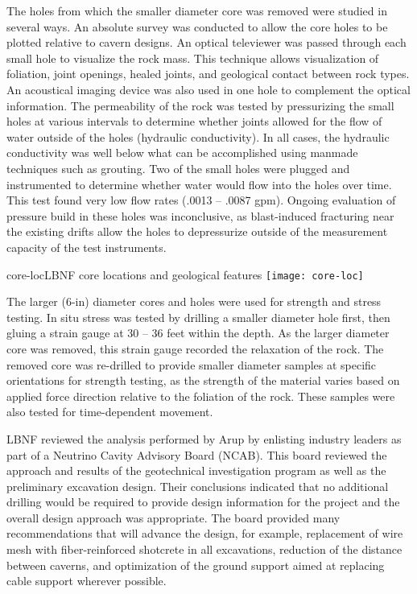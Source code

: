 The holes from which the smaller diameter core was removed were studied in several ways.  An absolute survey was conducted to allow the core holes to be plotted relative to cavern designs.  An optical televiewer was passed through each small hole to visualize the rock mass.  This technique allows visualization of foliation, joint openings, healed joints, and geological contact between rock types.  An acoustical imaging device was also used in one hole to complement the optical information.  The permeability of the rock was tested by pressurizing the small holes at various intervals to determine whether joints allowed for the flow of water outside of the holes (hydraulic conductivity).  In all cases, the hydraulic conductivity was well below what can be accomplished using manmade techniques such as grouting.   Two of the small holes were plugged and instrumented to determine whether water would flow into the holes over time.  This test found very low flow rates (.0013 -- .0087 gpm).  Ongoing evaluation of pressure build in these holes was inconclusive, as blast-induced fracturing near the existing drifts allow the holes to depressurize outside of the measurement capacity of the test instruments.

\begin{cdrfigure}{core-loc}{LBNF core locations and geological features}
\texttt{[image: core-loc]}
\end{cdrfigure}

The larger (6-in) diameter cores and holes were used for strength and stress testing.  In situ stress was tested by drilling a smaller diameter hole first, then gluing a strain gauge at 30 -- 36 feet within the depth.  As the larger diameter core was removed, this strain gauge recorded the relaxation of the rock.  The removed core was re-drilled to provide smaller diameter samples at specific orientations for strength testing, as the strength of the material varies based on applied force direction relative to the foliation of the rock.  These samples were also tested for time-dependent movement. 

LBNF reviewed the analysis performed by Arup by enlisting industry leaders as part of a Neutrino Cavity Advisory Board (NCAB).  This board reviewed the %
approach and results of the geotechnical investigation program as well as the preliminary excavation design.  Their conclusions indicated that no additional drilling would be required to provide design information for the project and the overall design approach was appropriate.  The board provided many recommendations that will %
advance the design, 
for example, replacement of wire mesh with fiber-reinforced shotcrete in all excavations, reduction of the distance between caverns, and optimization of the ground support aimed at replacing cable support wherever possible. 


